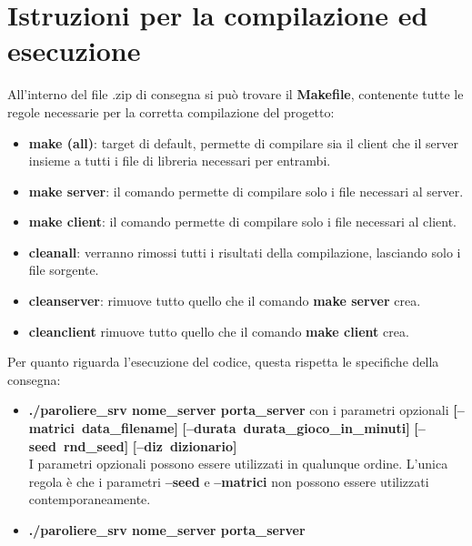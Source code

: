 \documentclass[a4paper]{article}
\begin{document}


\pagestyle{fancy}

\fancyhead{}

\fancyfoot{} 
\fancyfoot[C]{\thepage}


\tableofcontents
\newpage
    \section{Istruzioni per la compilazione ed esecuzione}
    All'interno del file .zip di consegna si può trovare il \textbf{Makefile}, contenente tutte le regole necessarie per la corretta compilazione del progetto:
    \begin{itemize}
        \item \textbf{make (all)}: target di default, permette di compilare sia il client che il server insieme a tutti i file di libreria necessari per entrambi.
        \item \textbf{make server}: il comando permette di compilare solo i file necessari al server.
        \item \textbf{make client}: il comando permette di compilare solo i file necessari al client.
        \item \textbf{cleanall}: verranno rimossi tutti i risultati della compilazione, lasciando solo i file sorgente.
        \item \textbf{cleanserver}: rimuove tutto quello che il comando \textbf{make server} crea.
        \item \textbf{cleanclient} rimuove tutto quello che il comando \textbf{make client} crea.
    \end{itemize}
    
    Per quanto riguarda l'esecuzione del codice, questa rispetta le specifiche della consegna:
    \begin{itemize}
         \item \textbf{./paroliere\_srv nome\_server porta\_server} con i parametri opzionali \textbf{[--matrici\ data\_filename]} \textbf{[--durata\ durata\_gioco\_in\_minuti]}
         \textbf{[--seed\ rnd\_seed]} \textbf{[--diz\ dizionario]}
         \\I parametri opzionali possono essere utilizzati in qualunque ordine. L'unica regola è che i parametri \textbf{--seed} e \textbf{--matrici} non possono essere utilizzati contemporaneamente.
         \item \textbf{./paroliere\_srv nome\_server porta\_server}
    \end{itemize}
\end{document}
